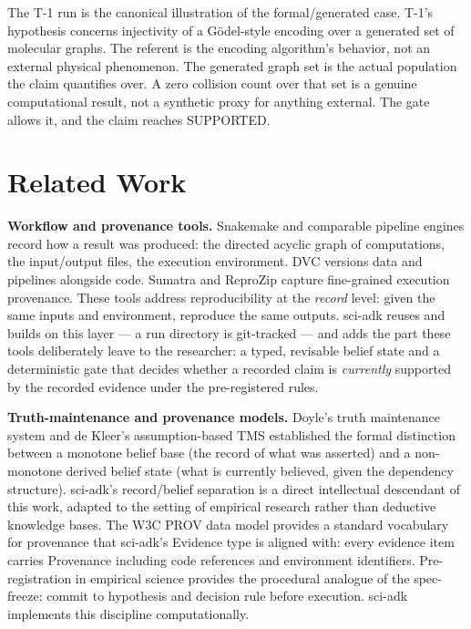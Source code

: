 \documentclass[11pt]{article}
\begin{document}
The T-1 run is the canonical illustration of the formal/generated case. T-1's hypothesis concerns injectivity of a G\"{o}del-style encoding over a generated set of molecular graphs. The referent is the encoding algorithm's behavior, not an external physical phenomenon. The generated graph set is the actual population the claim quantifies over. A zero collision count over that set is a genuine computational result, not a synthetic proxy for anything external. The gate allows it, and the claim reaches SUPPORTED.

\section{Related Work}

\textbf{Workflow and provenance tools.} Snakemake \citep{snakemake} and comparable pipeline engines record how a result was produced: the directed acyclic graph of computations, the input/output files, the execution environment. DVC versions data and pipelines alongside code. Sumatra \citep{sumatra} and ReproZip \citep{reprozip} capture fine-grained execution provenance. These tools address reproducibility at the \textit{record} level: given the same inputs and environment, reproduce the same outputs. sci-adk reuses and builds on this layer --- a run directory is git-tracked --- and adds the part these tools deliberately leave to the researcher: a typed, revisable belief state and a deterministic gate that decides whether a recorded claim is \textit{currently} supported by the recorded evidence under the pre-registered rules.

\textbf{Truth-maintenance and provenance models.} Doyle's truth maintenance system \citep{doyle} and de Kleer's assumption-based TMS \citep{dekleer} established the formal distinction between a monotone belief base (the record of what was asserted) and a non-monotone derived belief state (what is currently believed, given the dependency structure). sci-adk's record/belief separation is a direct intellectual descendant of this work, adapted to the setting of empirical research rather than deductive knowledge bases. The W3C PROV data model \citep{prov} provides a standard vocabulary for provenance that sci-adk's Evidence type is aligned with: every evidence item carries Provenance including code references and environment identifiers. Pre-registration in empirical science \citep{prereg} provides the procedural analogue of the spec-freeze: commit to hypothesis and decision rule before execution. sci-adk implements this discipline computationally.
\end{document}
